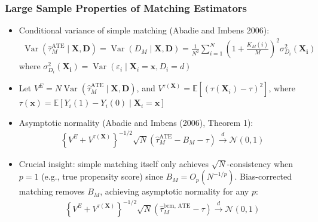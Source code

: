 \documentclass[10pt, handout]{beamer}
\DeclareMathOperator{\Var}{Var}
\begin{document}
\begin{frame}
  \frametitle{Large Sample Properties of Matching Estimators}

  \begin{itemize}
    \item Conditional variance of simple matching (Abadie and Imbens 2006):
    \begin{align*}
      \Var \left( \hat{\tau}_{M}^{\text{ATE}} \mid \mathbf{X}, \mathbf{D} \right) = \Var \left( D_M \mid \mathbf{X}, \mathbf{D} \right)  = \frac{1}{N^2} \sum_{i = 1}^N \left( 1 + \frac{K_M(i)}{M} \right)^2 \sigma_{D_i}^2 (\mathbf{X_i})
    \end{align*}
    where $\sigma_{D_i}^2 (\mathbf{X_i}) = \Var \left( \varepsilon_i \mid \mathbf{X}_i = \mathbf{x}, D_i = d \right)$
    \item Let $V^E = N \Var \left( \hat{\tau}_{M}^{\text{ATE}} \mid \mathbf{X}, \mathbf{D} \right)$, and $V^{\tau(\mathbf{X})} = \mathbb{E}\left[ (\tau(\mathbf{X}_i) - \tau)^2 \right]$, where $\tau(\mathbf{x}) = \mathbb{E}\left[ Y_i(1) - Y_i(0) \mid \mathbf{X}_i = \mathbf{x} \right]$
    \item Asymptotic normality (Abadie and Imbens (2006), Theorem 1):
    \begin{align*}
      \left\{ V^E + V^{\tau(\mathbf{X})} \right\}^{-1/2} \sqrt{N} \left( \hat{\tau}_{M}^{\text{ATE}} - B_M - \tau \right) \xrightarrow{d} \mathcal{N}(0, 1)
    \end{align*}
    \item Crucial insight: simple matching itself only achieves $\sqrt{N}$-consistency when $p = 1$ (e.g., true propensity score) since $B_M = O_p \left( N^{-1 / p} \right)$. Bias-corrected matching removes $B_M$, achieving asymptotic normality for any $p$:
    \begin{align*}
      \left\{ V^E + V^{\tau(\mathbf{X})} \right\}^{-1/2} \sqrt{N} \left( \hat{\tau}_M^{\text{bcm, ATE}} - \tau \right) \xrightarrow{d} \mathcal{N}(0, 1)
    \end{align*}
  \end{itemize}

  

\end{frame}
\end{document}
